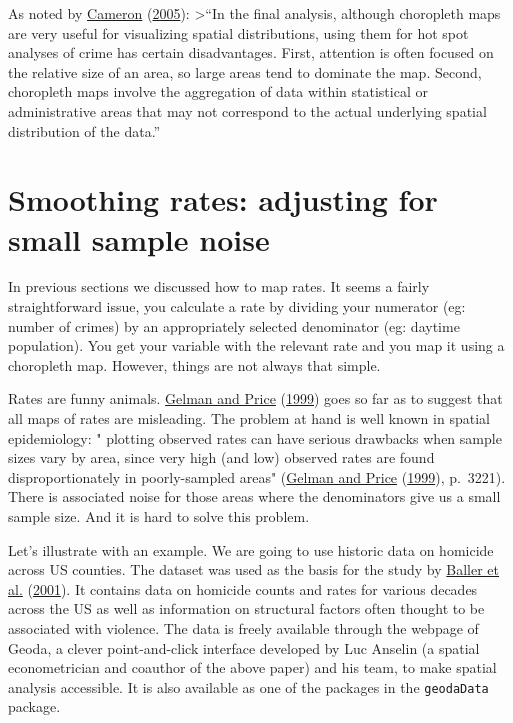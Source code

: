 \documentclass[
]{book}
\begin{document}
As noted by \protect\hyperlink{ref-Cameron_2005}{Cameron} (\protect\hyperlink{ref-Cameron_2005}{2005}):
\textgreater{}``In the final analysis, although choropleth maps are very useful for visualizing spatial distributions, using them for hot spot analyses of crime has certain disadvantages. First, attention is often focused on the relative size of an area, so large areas tend to dominate the map. Second, choropleth maps involve the aggregation of data within statistical or administrative areas that may not correspond to the actual underlying spatial distribution of the data.''

\hypertarget{smoothing-rates-adjusting-for-small-sample-noise}{%
\section{Smoothing rates: adjusting for small sample noise}\label{smoothing-rates-adjusting-for-small-sample-noise}}

In previous sections we discussed how to map rates. It seems a fairly straightforward issue, you calculate a rate by dividing your numerator (eg: number of crimes) by an appropriately selected denominator (eg: daytime population). You get your variable with the relevant rate and you map it using a choropleth map. However, things are not always that simple.

Rates are funny animals. \protect\hyperlink{ref-Gelman_1999}{Gelman and Price} (\protect\hyperlink{ref-Gelman_1999}{1999}) goes so far as to suggest that all maps of rates are misleading. The problem at hand is well known in spatial epidemiology: " plotting observed rates can have serious drawbacks when sample sizes vary by area, since very high (and low) observed rates are found disproportionately in poorly-sampled areas" (\protect\hyperlink{ref-Gelman_1999}{Gelman and Price} (\protect\hyperlink{ref-Gelman_1999}{1999}), p.~3221). There is associated noise for those areas where the denominators give us a small sample size. And it is hard to solve this problem.

Let's illustrate with an example. We are going to use historic data on homicide across US counties. The dataset was used as the basis for the study by \protect\hyperlink{ref-Baller_2001}{Baller et al.} (\protect\hyperlink{ref-Baller_2001}{2001}). It contains data on homicide counts and rates for various decades across the US as well as information on structural factors often thought to be associated with violence. The data is freely available through the webpage of Geoda, a clever point-and-click interface developed by Luc Anselin (a spatial econometrician and coauthor of the above paper) and his team, to make spatial analysis accessible. It is also available as one of the packages in the \texttt{geodaData} package.
\end{document}
